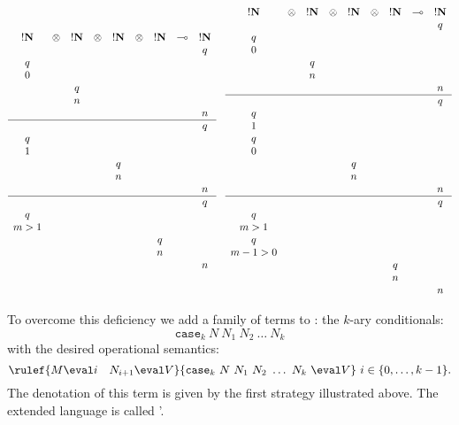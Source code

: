 $$
\begin{array}{ccccccccc}
!\bf N & \otimes & !\bf N & \otimes & !\bf N & \otimes & !\bf N & \multimap & !\bf N \\
&&&&&&&&q \\
q \\
0 \\
&& q \\
&& n \\
&&&&&&&&n \\
\hline
&&&&&&&&q \\
q \\
1 \\
&&&& q \\
&&&& n \\
&&&&&&&&n \\
\hline
&&&&&&&&q \\
q \\
m>1 \\
&&&&&& q \\
&&&&&& n \\
&&&&&&&&n \\
\end{array}
\hspace{0.3cm}
\begin{array}{ccccccccc}
!\bf N & \otimes & !\bf N & \otimes & !\bf N & \otimes & !\bf N & \multimap & !\bf N \\
&&&&&&&&q \\
q \\
0 \\
&& q \\
&& n \\
&&&&&&&&n \\
\hline
&&&&&&&&q \\
q \\
1 \\
q \\
0 \\
&&&& q \\
&&&& n \\
&&&&&&&&n \\
\hline
&&&&&&&&q \\
q \\
m>1 \\
q \\
m-1>0 \\
&&&&&& q \\
&&&&&& n \\
&&&&&&&&n \\
\end{array}
$$

To overcome this deficiency we add a family of terms to \pcf: the
$k$-ary conditionals:
$$ \texttt{case}_k\ N\ N_1\ N_2\ \ldots\ N_k$$
with the desired operational semantics:
$$ \rulef{M \eval i \quad N_{i+1} \eval V}{\texttt{case}_k\ N\ N_1\ N_2\ \ldots\ N_k\ \eval V}\ i \in \{0, \ldots,k-1\}.$$
The denotation of this term is given by the first strategy illustrated above.
The extended language is called \pcf'.

